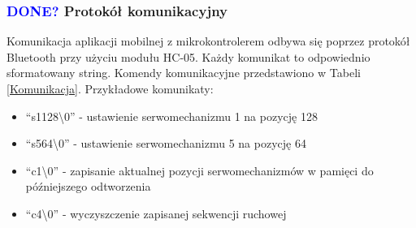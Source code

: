 \documentclass[11pt,titlepage,a4paper]{article}
\begin{document}
\subsubsection{\textcolor{blue}{DONE?} Protokół komunikacyjny}

Komunikacja aplikacji mobilnej z mikrokontrolerem odbywa się poprzez protokół Bluetooth przy użyciu modułu HC-05. Każdy komunikat to odpowiednio sformatowany string. Komendy komunikacyjne przedstawiono w Tabeli \ref{Komunikacja}. Przykładowe komunikaty:
\begin{itemize}
    \item \enquote{s1128\textbackslash0} - ustawienie serwomechanizmu 1 na pozycję 128
    \item \enquote{s564\textbackslash0} - ustawienie serwomechanizmu 5 na pozycję 64
    \item \enquote{c1\textbackslash0} - zapisanie aktualnej pozycji serwomechanizmów w pamięci do późniejszego odtworzenia
    \item \enquote{c4\textbackslash0} - wyczyszczenie zapisanej sekwencji ruchowej
\end{itemize}

\vspace{2cm}
\end{document}

